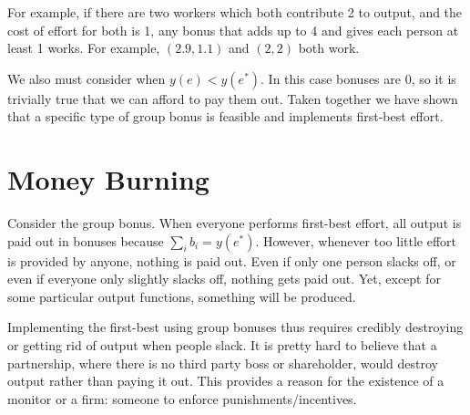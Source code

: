 \documentclass{article}
\begin{document}
For example, if there are two workers which both contribute 2 to output, and the cost of effort for both is 1, any bonus that adds up to 4 and gives each person at least 1 works. For example, $(2.9, 1.1)$ and $(2,2)$ both work.


We also must consider when $y(e)<y(e^*)$. In this case bonuses are 0, so it is trivially true that we can afford to pay them out. Taken together we have shown that a specific type of group bonus is feasible and implements first-best effort.





\section{Money Burning}

Consider the group bonus. When everyone performs first-best effort, all output is paid out in bonuses because $\sum_i b_i = y(e^*)$. However, whenever too little effort is provided by anyone, nothing is paid out. Even if only one person slacks off, or even if everyone only slightly slacks off, nothing gets paid out. Yet, except for some particular output functions, something will be produced.

Implementing the first-best using group bonuses thus requires credibly destroying or getting rid of output when people slack. It is pretty hard to believe that a partnership, where there is no third party boss or shareholder, would destroy output rather than paying it out. This provides a reason for the existence of a monitor or a firm: someone to enforce punishments/incentives.
\end{document}
